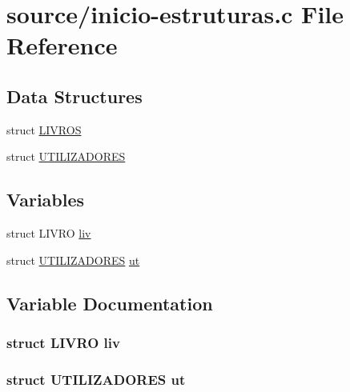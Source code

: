 \hypertarget{inicio-estruturas_8c}{\section{source/inicio-\/estruturas.c File Reference}
\label{inicio-estruturas_8c}
}
\subsection*{Data Structures}
\begin{DoxyCompactItemize}
\item 
struct \hyperlink{struct_l_i_v_r_o_s}{L\+I\+V\+R\+O\+S}
\item 
struct \hyperlink{struct_u_t_i_l_i_z_a_d_o_r_e_s}{U\+T\+I\+L\+I\+Z\+A\+D\+O\+R\+E\+S}
\end{DoxyCompactItemize}
\subsection*{Variables}
\begin{DoxyCompactItemize}
\item 
struct L\+I\+V\+R\+O \hyperlink{inicio-estruturas_8c_a870a36959aefbacb87f69453cb403504}{liv}
\item 
struct \hyperlink{struct_u_t_i_l_i_z_a_d_o_r_e_s}{U\+T\+I\+L\+I\+Z\+A\+D\+O\+R\+E\+S} \hyperlink{inicio-estruturas_8c_ac541981d405041be6da1b089d395b4ef}{ut}
\end{DoxyCompactItemize}


\subsection{Variable Documentation}
\hypertarget{inicio-estruturas_8c_a870a36959aefbacb87f69453cb403504}{
\subsubsection[{liv}]{\setlength{\rightskip}{0pt plus 5cm}struct L\+I\+V\+R\+O liv}}\label{inicio-estruturas_8c_a870a36959aefbacb87f69453cb403504}
\hypertarget{inicio-estruturas_8c_ac541981d405041be6da1b089d395b4ef}{
\subsubsection[{ut}]{\setlength{\rightskip}{0pt plus 5cm}struct {\bf U\+T\+I\+L\+I\+Z\+A\+D\+O\+R\+E\+S} ut}}\label{inicio-estruturas_8c_ac541981d405041be6da1b089d395b4ef}
